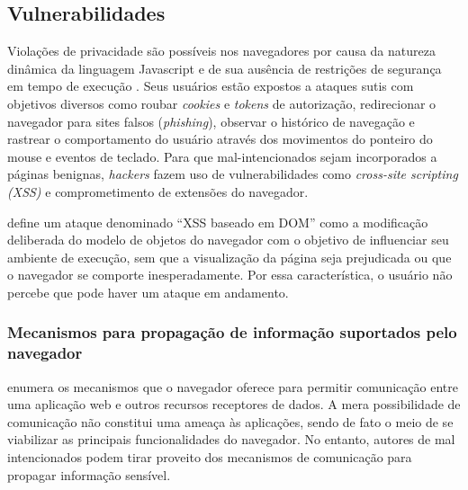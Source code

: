 \subsection{Vulnerabilidades}
Violações de privacidade são possíveis nos navegadores por causa da natureza dinâmica da linguagem Javascript e de sua ausência de restrições de segurança em tempo de execução \cite{Jang2010}. Seus usuários estão expostos a ataques sutis com objetivos diversos como roubar \textit{cookies} e \textit{tokens} de autorização, redirecionar o navegador para sites falsos (\textit{phishing}), observar o histórico de navegação e rastrear o comportamento do usuário através dos movimentos do ponteiro do mouse e eventos de teclado. Para que {\scripts} mal-intencionados sejam incorporados a páginas benignas, \textit{hackers} fazem uso de vulnerabilidades como \textit{cross-site scripting (XSS)} \cite{OWASP:XSS} e comprometimento de extensões \cite{Heule2015_Most_Dangerous_Code} do navegador.


\cite{OWASP:DOMXSS} define um ataque denominado ``XSS baseado em DOM'' como a modificação deliberada do modelo de objetos do navegador com o objetivo de influenciar seu ambiente de execução, sem que a visualização da página seja prejudicada ou que o navegador se comporte inesperadamente. Por essa característica, o usuário não percebe que pode haver um ataque em andamento.

\subsubsection{Mecanismos para propagação de informação suportados pelo navegador}
\label{Secao: Vulnerabilidades_MecanismosPropagacao}
 enumera os mecanismos que o navegador oferece para permitir comunicação entre uma aplicação web e outros recursos receptores de dados. A mera possibilidade de comunicação não constitui uma ameaça às aplicações, sendo de fato o meio de se viabilizar as principais funcionalidades do navegador. No entanto, autores de \scripts{} mal intencionados podem tirar proveito dos mecanismos de comunicação para propagar informação sensível.

